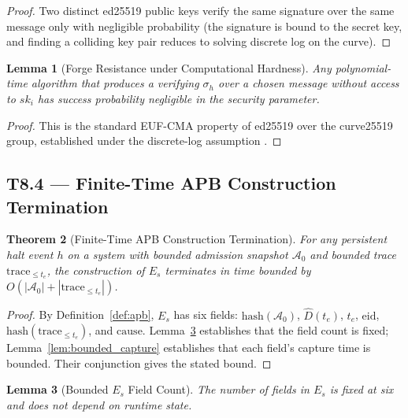 \documentclass[11pt]{article}
\newtheorem{theorem}{Theorem}[section]
\newtheorem{lemma}[theorem]{Lemma}
\newcommand{\Azero}{\mathcal{A}_0}
\newcommand{\Dhat}{\widehat{D}}
\newcommand{\Es}{E_s}
\newcommand{\sigh}{\sigma_h}
\newcommand{\ski}{sk_i}
\begin{document}
\begin{proof}
Two distinct ed25519 public keys verify the same signature over the
same message only with negligible probability (the signature is bound
to the secret key, and finding a colliding key pair reduces to
solving discrete log on the curve).
\end{proof}

\begin{lemma}[Forge Resistance under Computational Hardness]
\label{lem:forge}
Any polynomial-time algorithm that produces a verifying $\sigh$ over
a chosen message without access to $\ski$ has success probability
negligible in the security parameter.
\end{lemma}

\begin{proof}
This is the standard EUF-CMA property of ed25519 over the
curve25519 group, established under the discrete-log assumption
\citep{bernstein2012highspeed,boneh2014foundations}.
\end{proof}

\subsection{T8.4 --- Finite-Time APB Construction Termination}
\label{sec:t84}

\begin{theorem}[Finite-Time APB Construction Termination]
\label{thm:t84}
For any persistent halt event $h$ on a system with bounded admission
snapshot $\Azero$ and bounded trace $\mathrm{trace}_{\le t_e}$, the
construction of $\Es$ terminates in time bounded by
$O(|\Azero| + |\mathrm{trace}_{\le t_e}|)$.
\end{theorem}

\begin{proof}
By Definition~\ref{def:apb}, $\Es$ has six fields:
$\mathrm{hash}(\Azero)$, $\Dhat(t_e)$, $t_e$, $\mathrm{eid}$,
$\mathrm{hash}(\mathrm{trace}_{\le t_e})$, and $\mathrm{cause}$.
Lemma~\ref{lem:bounded_count} establishes that the field count is
fixed; Lemma~\ref{lem:bounded_capture} establishes that each field's
capture time is bounded. Their conjunction gives the stated bound.
\end{proof}

\begin{lemma}[Bounded $\Es$ Field Count]
\label{lem:bounded_count}
The number of fields in $\Es$ is fixed at six and does not depend
on runtime state.
\end{lemma}
\end{document}
